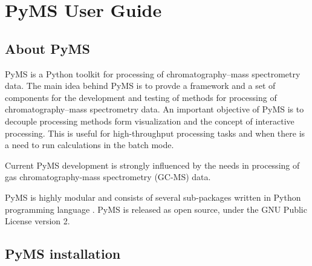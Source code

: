 

\chapter{PyMS User Guide}


\section{About PyMS}

PyMS is a Python toolkit for processing of chromatography--mass spectrometry
data. The main idea behind PyMS is to provde a framework and a set of
components for the development and testing of methods for processing of
chromatography--mass spectrometry data. An important objective of PyMS is
to decouple processing methods form visualization and the concept of interactive
processing. This is useful for high-throughput processing tasks and when
there is a need to run calculations in the batch mode.

Current PyMS development is strongly influenced by the needs in processing of
gas chromatography-mass spectrometry (GC-MS) data.

PyMS is highly modular and consists of several sub-packages written in Python
programming language \cite{python}. PyMS is released as open source, under
the GNU Public License version 2.


\section{PyMS installation}

